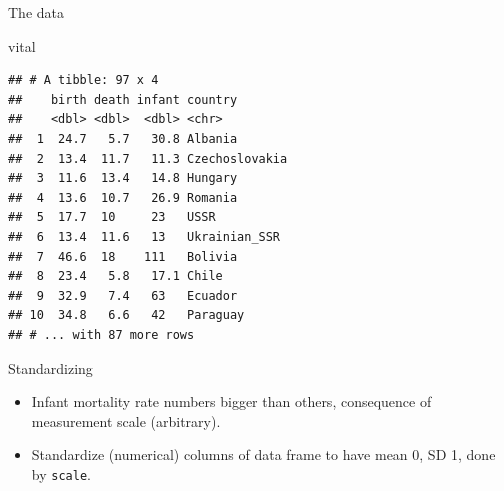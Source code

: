 \documentclass[
  ignorenonframetext,
]{beamer}
\newenvironment{Shaded}{\begin{snugshade}}{\end{snugshade}}
\newcommand{\KeywordTok}[1]{\textcolor[rgb]{0.13,0.29,0.53}{\textbf{#1}}}
\newcommand{\NormalTok}[1]{#1}
\newcommand{\OperatorTok}[1]{\textcolor[rgb]{0.81,0.36,0.00}{\textbf{#1}}}
\newcommand{\StringTok}[1]{\textcolor[rgb]{0.31,0.60,0.02}{#1}}
\begin{document}
\begin{frame}[fragile]{The data}
\protect\hypertarget{the-data-12}{}

\begin{Shaded}
\begin{Highlighting}[]
\NormalTok{vital}
\end{Highlighting}
\end{Shaded}

\begin{verbatim}
## # A tibble: 97 x 4
##    birth death infant country       
##    <dbl> <dbl>  <dbl> <chr>         
##  1  24.7   5.7   30.8 Albania       
##  2  13.4  11.7   11.3 Czechoslovakia
##  3  11.6  13.4   14.8 Hungary       
##  4  13.6  10.7   26.9 Romania       
##  5  17.7  10     23   USSR          
##  6  13.4  11.6   13   Ukrainian_SSR 
##  7  46.6  18    111   Bolivia       
##  8  23.4   5.8   17.1 Chile         
##  9  32.9   7.4   63   Ecuador       
## 10  34.8   6.6   42   Paraguay      
## # ... with 87 more rows
\end{verbatim}

\end{frame}

\begin{frame}[fragile]{Standardizing}
\protect\hypertarget{standardizing}{}

\begin{itemize}
\item
  Infant mortality rate numbers bigger than others, consequence of
  measurement scale (arbitrary).
\item
  Standardize (numerical) columns of data frame to have mean 0, SD 1,
  done by \texttt{scale}.
\end{itemize}

\begin{Shaded}
\end{Shaded}

\end{frame}
\end{document}
